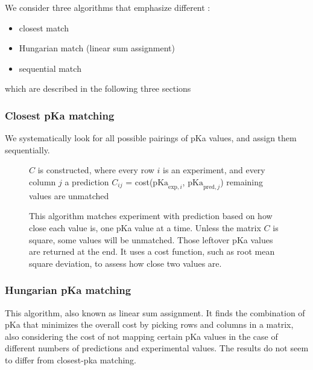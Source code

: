 \documentclass[9pt,lineno,final]{elife}
\newcommand{\pKa}{\mathrm{pKa}}
\begin{document}
We consider three algorithms that emphasize different :

\begin{itemize}
 \item closest match
 \item Hungarian match (linear sum assignment)
 \item sequential match
\end{itemize}

which are described in the following three sections

\subsubsection{Closest pKa matching}

We systematically look for all possible pairings of pKa values, and assign them sequentially. 

\begin{figure}

\begin{algorithm}[H]
	\SetAlgoLined
	\caption{This algorithm matches experiment with prediction based on how close each value is, one pKa value at a time. Unless the matrix $C$ is square, some values will be unmatched. Those leftover pKa values are returned at the end. It uses a cost function, such as root mean square deviation, to assess how close two values are.}
	\label{alg:closest}
	 
	$C$ is constructed, where every row  $i$ is an experiment, and every column $j$ a prediction\;
	$C_{ij}$ = cost($\pKa_{\text{exp},i}$, $\pKa_{\text{pred},j}$)\;
	remaining values are unmatched\;

\end{algorithm}
\end{figure}


\subsubsection{Hungarian pKa matching}
This algorithm, also known as linear sum assignment.
%
It finds the combination of pKa that minimizes the overall cost by picking rows and columns in a matrix, also considering the cost of not mapping certain pKa values in the case of different numbers of predictions and experimental values.
%
The results do not seem to differ from closest-pka matching.
\end{document}
